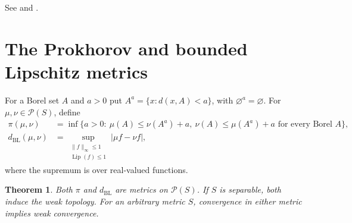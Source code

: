 \documentclass[11pt,oneside,openany]{book}
\theoremstyle{plain}
\newtheorem{theorem}{Theorem}[chapter]
\theoremstyle{definition}
\theoremstyle{remark}
\begin{document}
See \cite[Theorem 2.8, p.~23]{Billingsley} and
\cite[Theorem 5.30, pp.~118--119]{Kallenberg}.

\section{The Prokhorov and bounded Lipschitz metrics}
\label{p06-09}

For a Borel set \(A\) and \(a>0\) put
\(A^a=\{x:d(x,A)<a\}\), with \(\varnothing^a=\varnothing\). For
\(\mu,\nu\in\mathcal P(S)\), define
\[
 \begin{split}
 \pi(\mu,\nu)&=\inf\{a>0:\ 
    \mu(A)\leq\nu(A^a)+a,\ \nu(A)\leq\mu(A^a)+a
    \text{ for every Borel }A\},\\
 d_{\mathrm{BL}}(\mu,\nu)&=\sup_{\substack{\lVert f\rVert_\infty\leq1\\
                                    \operatorname{Lip}(f)\leq1}}
                               |\mu f-\nu f| ,
 \end{split}
\]
where the supremum is over real-valued functions.

\begin{theorem}
\label{thm:p06-weak-metrics}
Both \(\pi\) and \(d_{\mathrm{BL}}\) are metrics on
\(\mathcal P(S)\). If \(S\) is separable, both induce the weak
topology. For an arbitrary metric \(S\), convergence in either
metric implies weak convergence.
\end{theorem}
\end{document}
